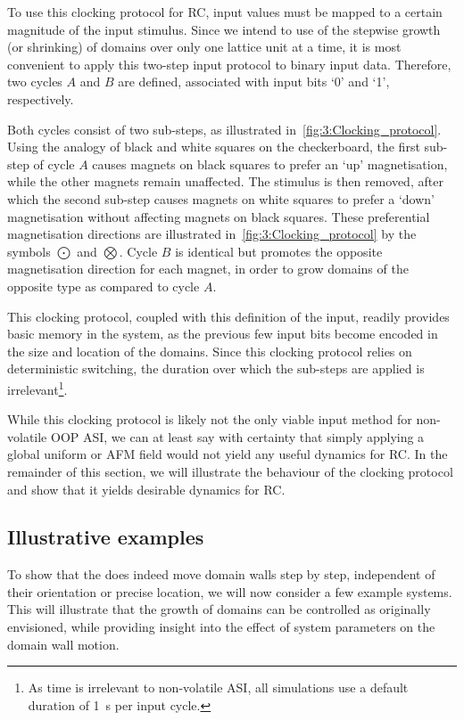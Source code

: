 To use this clocking protocol for RC, input values must be mapped to a certain magnitude of the input stimulus.
Since we intend to use of the stepwise growth (or shrinking) of domains over only one lattice unit at a time, it is most convenient to apply this two-step input protocol to binary input data.
Therefore, two cycles $A$ and $B$ are defined, associated with input bits `0' and `1', respectively. \par
Both cycles consist of two sub-steps, as illustrated in~\cref{fig:3:Clocking_protocol}.
Using the analogy of black and white squares on the checkerboard, the first sub-step of cycle $A$ causes magnets on black squares to prefer an `up' magnetisation, while the other magnets remain unaffected.
The stimulus is then removed, after which the second sub-step causes magnets on white squares to prefer a `down' magnetisation without affecting magnets on black squares.
These preferential magnetisation directions are illustrated in~\cref{fig:3:Clocking_protocol} by the symbols $\bigodot$ and $\bigotimes$.
Cycle $B$ is identical but promotes the opposite magnetisation direction for each magnet, in order to grow domains of the opposite type as compared to cycle $A$. \\\par
This clocking protocol, coupled with this definition of the input, readily provides basic memory in the system, as the previous few input bits become encoded in the size and location of the domains.
Since this clocking protocol relies on deterministic switching, the duration over which the sub-steps are applied is irrelevant\footnote{
	As time is irrelevant to non-volatile ASI, all simulations use a default duration of \qty{1}{\second} per input cycle.
}. \par
While this clocking protocol is likely not the only viable input method for non-volatile OOP ASI, we can at least say with certainty that simply applying a global uniform or AFM field would not yield any useful dynamics for RC.
In the remainder of this section, we will illustrate the behaviour of the clocking protocol and show that it yields desirable dynamics for RC.

\subsection{Illustrative examples}
To show that the  does indeed move domain walls step by step, independent of their orientation or precise location, we will now consider a few example systems.
This will illustrate that the growth of domains can be controlled as originally envisioned, while providing insight into the effect of system parameters on the domain wall motion.

